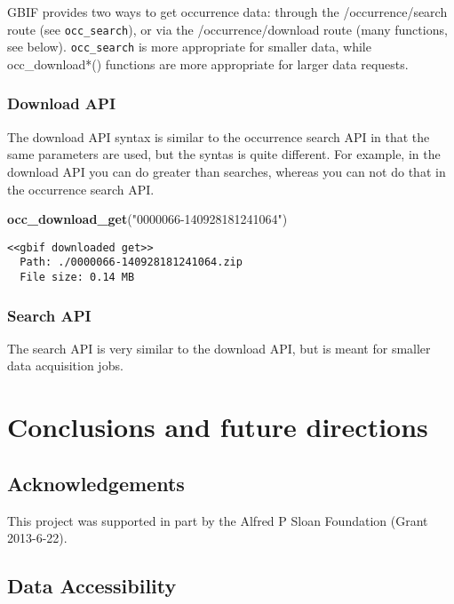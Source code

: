 \documentclass[author-year, review, 11pt]{components/elsarticle} %
\newenvironment{Shaded}{\begin{snugshade}}{\end{snugshade}}
\newcommand{\KeywordTok}[1]{\textcolor[rgb]{0.13,0.29,0.53}{\textbf{{#1}}}}
\newcommand{\StringTok}[1]{\textcolor[rgb]{0.31,0.60,0.02}{{#1}}}
\newcommand{\NormalTok}[1]{{#1}}
\begin{document}
GBIF provides two ways to get occurrence data: through the
/occurrence/search route (see \texttt{occ\_search}), or via the
/occurrence/download route (many functions, see below).
\texttt{occ\_search} is more appropriate for smaller data, while
occ\_download*() functions are more appropriate for larger data
requests.

\subsubsection{Download API}\label{download-api}

The download API syntax is similar to the occurrence search API in that
the same parameters are used, but the syntas is quite different. For
example, in the download API you can do greater than searches, whereas
you can not do that in the occurrence search API.

\begin{Shaded}
\begin{Highlighting}[]
\KeywordTok{occ_download_get}\NormalTok{(}\StringTok{"0000066-140928181241064"}\NormalTok{)}
\end{Highlighting}
\end{Shaded}

\begin{verbatim}
<<gbif downloaded get>>
  Path: ./0000066-140928181241064.zip
  File size: 0.14 MB
\end{verbatim}

\subsubsection{Search API}\label{search-api}

The search API is very similar to the download API, but is meant for
smaller data acquisition jobs.

\section{Conclusions and future
directions}\label{conclusions-and-future-directions}

\subsection{Acknowledgements}\label{acknowledgements}

This project was supported in part by the Alfred P Sloan Foundation
(Grant 2013-6-22).

\subsection{Data Accessibility}\label{data-accessibility}
\end{document}
